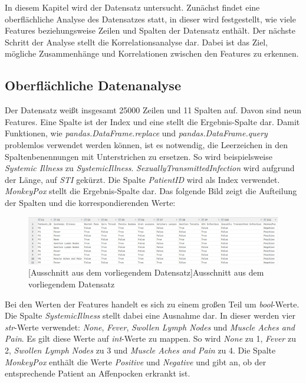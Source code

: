 \documentclass[13pt,a4paper, listof=entryprefix, bibliography=totocnumbered,toc=listofnumbered,lof=listofnumbered]{scrartcl}
\begin{document}
In diesem Kapitel wird der Datensatz untersucht. Zunächst findet eine oberflächliche Analyse des Datensatzes statt, in dieser
wird festgestellt, wie viele Features beziehungsweise Zeilen und Spalten der Datensatz enthält. Der nächste Schritt der Analyse stellt die Korrelationsanalyse
dar. Dabei ist das Ziel, mögliche Zusammenhänge und Korrelationen zwischen den Features zu erkennen. 

	\subsection{Oberflächliche Datenanalyse}
		\label{ch:oberflaechliche_analyse}

Der Datensatz weißt insgesamt 25000 Zeilen und 11 Spalten auf. Davon sind 
neun Features. Eine Spalte ist der Index und eine stellt die Ergebnis-Spalte dar. Damit Funktionen, wie \textit{pandas.DataFrame.replace} und 
\textit{pandas.DataFrame.query} problemlos verwendet werden können, ist es notwendig, die Leerzeichen in den Spaltenbenennungen mit Unterstrichen zu ersetzen. 
So wird beispielsweise \textit{Systemic Illness} zu \textit{Systemic\textunderscore Illness}. \textit{Sexually\textunderscore Transmitted\textunderscore Infection} wird aufgrund der Länge, auf
\textit{STI} gekürzt. Die Spalte \textit{Patient\textunderscore ID} wird als Index verwendet. 
\textit{MonkeyPox} stellt die Ergebnis-Spalte dar. Das folgende Bild zeigt die Aufteilung der Spalten und die korrespondierenden Werte:

	\begin{figure}[H]
		\centering
		\includegraphics[width=0.8\linewidth]{Bilder/data_table.png}
		[Ausschnitt aus dem vorliegendem Datensatz]{Ausschnitt aus dem vorliegendem Datensatz}
		\label{fig:data_table}
	\end{figure}

Bei den Werten der Features handelt es sich zu einem großen Teil um \textit{bool}-Werte. Die Spalte \textit{Systemic\textunderscore Illness} stellt dabei eine Ausnahme dar. In dieser werden
vier \textit{str}-Werte verwendet: \textit{None}, \textit{Fever}, \textit{Swollen Lymph Nodes} und \textit{Muscle Aches and Pain}. Es gilt diese Werte auf \textit{int}-Werte zu mappen. So wird \textit{None} zu 1,
\textit{Fever} zu 2, \textit{Swollen Lymph Nodes} zu 3 und \textit{Muscle Aches and Pain} zu 4. Die Spalte \textit{MonkeyPox} enthält die Werte \textit{Positive} und \textit{Negative} und gibt
an, ob der entsprechende Patient an Affenpocken erkrankt ist.
\end{document}
